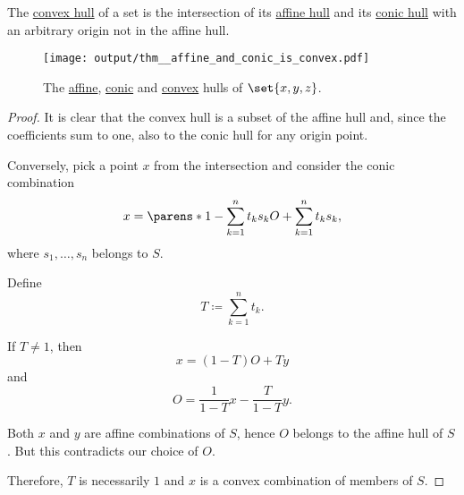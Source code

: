 \begin{proposition}\label{thm:affine_and_conic_is_convex}
  The \hyperref[def:convex_hull]{convex hull} of a set is the intersection of its \hyperref[def:affine_hull]{affine hull} and its \hyperref[def:conic_hull]{conic hull} with an arbitrary origin not in the affine hull.

  \begin{figure}[!ht]
    \centering
    \texttt{[image: output/thm\_\_affine\_and\_conic\_is\_convex.pdf]}
    \caption{The \hyperref[def:affine_hull]{affine}, \hyperref[def:conic_hull]{conic} and \hyperref[def:convex_hull]{convex} hulls of \( \set{ x, y, z } \).}\label{fig:thm:affine_and_conic_is_convex}
  \end{figure}
\end{proposition}
\begin{proof}
  It is clear that the convex hull is a subset of the affine hull and, since the coefficients sum to one, also to the conic hull for any origin point.

  Conversely, pick a point \( x \) from the intersection and consider the conic combination
  \begin{equation*}
    x = \parens*{ 1 - \sum_{k=1}^n t_k s_k } O + \sum_{k=1}^n t_k s_k,
  \end{equation*}
  where \( s_1, \ldots, s_n \) belongs to \( S \).

  Define
  \begin{equation*}
    T \coloneqq \sum_{k=1}^n t_k.
  \end{equation*}

  If \( T \neq 1 \), then
  \begin{equation*}
    x = (1 - T) O + T y
  \end{equation*}
  and
  \begin{equation*}
    O = \frac 1 {1 - T} x - \frac T {1 - T} y.
  \end{equation*}

  Both \( x \) and \( y \) are affine combinations of \( S \), hence \( O \) belongs to the affine hull of \( S \). But this contradicts our choice of \( O \).

  Therefore, \( T \) is necessarily \( 1 \) and \( x \) is a convex combination of members of \( S \).
\end{proof}


